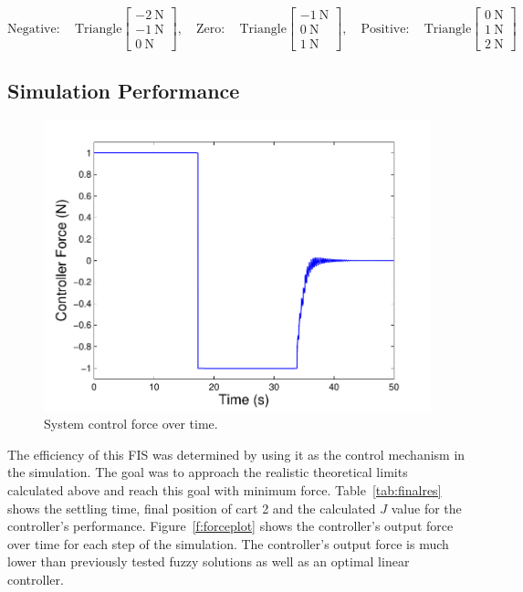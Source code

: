 \documentclass[submit]{aiaa-tc}%
\begin{document}
\begin{displaymath}
\mathrm{Negative:}\quad \mathrm{Triangle}\begin{bmatrix}
\SI{-2}{\newton}\\\SI{-1}{\newton}\\\SI{0}{\newton}
\end{bmatrix},
\quad
\mathrm{Zero:}\quad \mathrm{Triangle}\begin{bmatrix}
\SI{-1}{\newton}\\\SI{0}{\newton}\\\SI{1}{\newton}
\end{bmatrix},
\quad
\mathrm{Positive:}\quad \mathrm{Triangle}\begin{bmatrix}
\SI{0}{\newton}\\\SI{1}{\newton}\\\SI{2}{\newton}
\end{bmatrix}
\end{displaymath}

\subsection{Simulation Performance}\label{ss:simperf}
\begin{figure}
\includegraphics{FuzzyForcePlot.pdf}
\caption{System control force over time.}
\label{f:forceplot}
\end{figure}


The efficiency of this FIS was determined by using it as the control mechanism in the simulation. The goal was to approach the realistic theoretical limits calculated above and reach this goal with minimum force. Table~\vref{tab:finalres} shows the settling time, final position of cart 2 and the calculated $J$ value for the controller's performance. Figure~\vref{f:forceplot} shows the controller's output force over time for each step of the simulation. The controller's output force is much lower than previously tested fuzzy solutions as well as an optimal linear controller.
\end{document}
